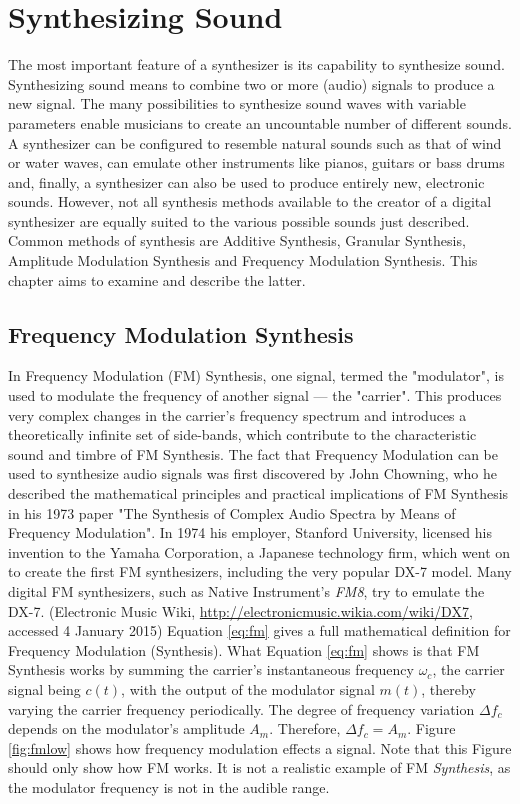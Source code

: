 \chapter{Synthesizing Sound}

The most important feature of a synthesizer is its capability to synthesize sound. Synthesizing sound means to combine two or more (audio) signals to produce a new signal. The many possibilities to synthesize sound waves with variable parameters enable musicians to create an uncountable number of different sounds. A synthesizer can be configured to resemble natural sounds such as that of wind or water waves, can emulate other instruments like pianos, guitars or bass drums and, finally, a synthesizer can also be used to produce entirely new, electronic sounds. However, not all synthesis methods available to the creator of a digital synthesizer are equally suited to the various possible sounds just described. Common methods of synthesis are Additive Synthesis, Granular Synthesis, Amplitude Modulation Synthesis and Frequency Modulation Synthesis. This chapter aims to examine and describe the latter.

\section{Frequency Modulation Synthesis}

In Frequency Modulation (FM) Synthesis, one signal, termed the "modulator", is used to modulate the frequency of another signal --- the "carrier". This produces very complex changes in the carrier's frequency spectrum and introduces a theoretically infinite set of side-bands, which contribute to the characteristic sound and timbre of FM Synthesis. The fact that Frequency Modulation can be used to synthesize audio signals was first discovered by John Chowning, who he described the mathematical principles and practical implications of FM Synthesis in his 1973 paper "The Synthesis of Complex Audio Spectra by Means of Frequency Modulation". In 1974 his employer, Stanford University, licensed his invention to the Yamaha Corporation, a Japanese technology firm, which went on to create the first FM synthesizers, including the very popular DX-7 model. Many digital FM synthesizers, such as Native Instrument's \emph{FM8}, try to emulate the DX-7. (Electronic Music Wiki, \url{http://electronicmusic.wikia.com/wiki/DX7}, accessed 4 January 2015) Equation \ref{eq:fm} gives a full mathematical definition for Frequency Modulation (Synthesis). What Equation \ref{eq:fm} shows is that FM Synthesis works by summing the carrier's instantaneous frequency $\omega_{c}$, the carrier signal being $c(t)$, with the output of the modulator signal $m(t)$, thereby varying the carrier frequency periodically. The degree of frequency variation $\Delta f_{c}$ depends on the modulator's amplitude $A_{m}$. Therefore, $\Delta f_{c} = A_{m}$. Figure \ref{fig:fmlow} shows how frequency modulation effects a signal. Note that this Figure should only show how FM works. It is not a realistic example of FM \emph{Synthesis}, as the modulator frequency is not in the audible range.

